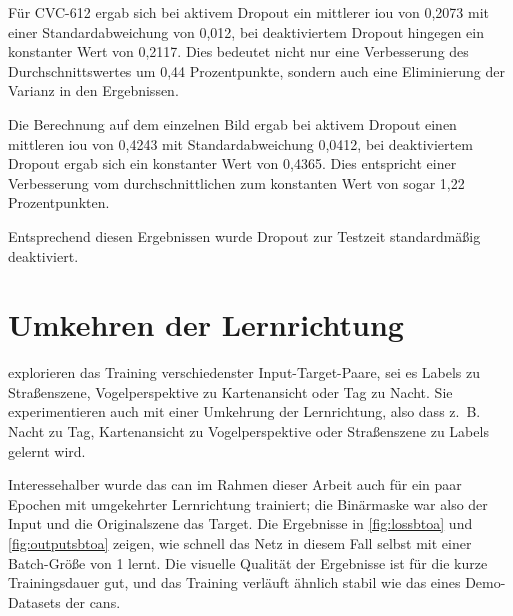 Für CVC-612 ergab sich bei aktivem Dropout ein mittlerer \gls{iou} von 0,2073 mit einer Standardabweichung von 0,012, bei deaktiviertem Dropout hingegen ein konstanter Wert von 0,2117.
Dies bedeutet nicht nur eine Verbesserung des Durchschnittswertes um 0,44 Prozentpunkte, sondern auch eine Eliminierung der Varianz in den Ergebnissen.

Die Berechnung auf dem einzelnen Bild ergab bei aktivem Dropout einen mittleren \gls{iou} von 0,4243 mit Standardabweichung 0,0412, bei deaktiviertem Dropout ergab sich ein konstanter Wert von 0,4365.
Dies entspricht einer Verbesserung vom durchschnittlichen zum konstanten Wert von sogar 1,22 Prozentpunkten.

Entsprechend diesen Ergebnissen wurde Dropout zur Testzeit standardmäßig deaktiviert.



\section{Umkehren der Lernrichtung}

\citeauthor{Isola.2017} explorieren das Training verschiedenster Input-Target-Paare, sei es Labels zu Straßenszene, Vogelperspektive zu Kartenansicht oder Tag zu Nacht.
Sie experimentieren auch mit einer Umkehrung der Lernrichtung, also dass z.~B. Nacht zu Tag, Kartenansicht zu Vogelperspektive oder Straßenszene zu Labels gelernt wird.

Interessehalber wurde das \gls{can} im Rahmen dieser Arbeit auch für ein paar Epochen mit umgekehrter Lernrichtung trainiert; die Binärmaske war also der Input und die Originalszene das Target.
Die Ergebnisse in \autoref{fig:lossbtoa} und \autoref{fig:outputsbtoa} zeigen, wie schnell das Netz in diesem Fall selbst mit einer Batch-Größe von 1 lernt.
Die visuelle Qualität der Ergebnisse ist für die kurze Trainingsdauer gut, und das Training verläuft ähnlich stabil wie das eines Demo-Datasets der \glspl{can}.


